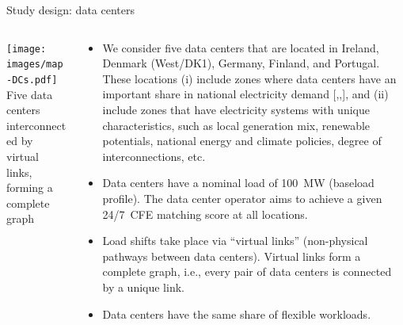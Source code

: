 \begin{frame}{Study design: data centers}
  
  {\footnotesize
  \begin{columns}[T]

  \begin{column}{7cm}
  \centering
  \vspace{0.5cm}
  \texttt{[image: images/map-DCs.pdf]}
  {\scriptsize Five data centers interconnected by virtual links, \\ 
  forming a complete graph}
  \end{column}

  \begin{column}{8cm}
  \begin{itemize}
    \item We consider \alert{five data centers} that are located in Ireland, Denmark (West/DK1), Germany, Finland, and Portugal. These locations (i) include zones where data centers have an important share in national electricity demand [,,], and (ii) include zones that have electricity systems with unique characteristics, such as local generation mix, renewable potentials, national energy and climate policies, degree of interconnections, etc. 
    \item Data centers have a nominal load of \alert{100~MW} (baseload profile). The data center operator aims to achieve a given 24/7~CFE matching score \alert{at all locations}. 
    \item Load shifts take place via \enquote{virtual links} (non-physical pathways between data centers). Virtual links form a \alert{complete graph}, i.e., every pair of data centers is connected by a unique link.
    \item Data centers have the \alert{same share of flexible workloads}. 
  \end{itemize}

  \end{column}
  \end{columns}
  }

\end{frame}



